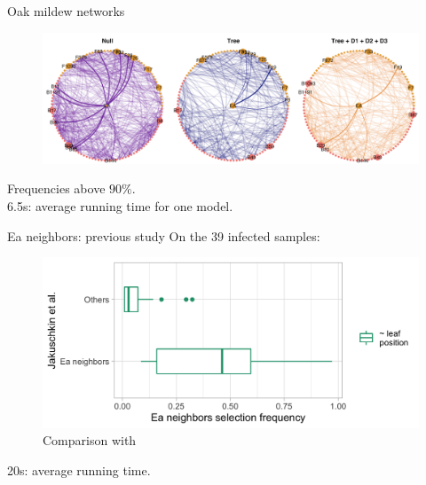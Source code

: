 \documentclass[11pt]{beamer}
\begin{document}
\begin{frame}{Oak mildew networks}
\begin{center}
\begin{figure}[htp]
\includegraphics[width=\linewidth]{images/OakProbNets.png}
\end{figure}
\end{center}
\bigskip

\footnotesize{Frequencies above $90\%$.\\6.5s: average running time for one model.}\normalsize
\end{frame}
\begin{frame}{Ea neighbors: previous study}
On the 39 infected samples:
\begin{figure}
\includegraphics[width=0.8\linewidth]{images/EAneighbors.png}
\caption{Comparison with \citet{jakuch}}
\end{figure}
\footnotesize{20s: average running time.}\normalsize
\end{frame}

 
\end{document}
